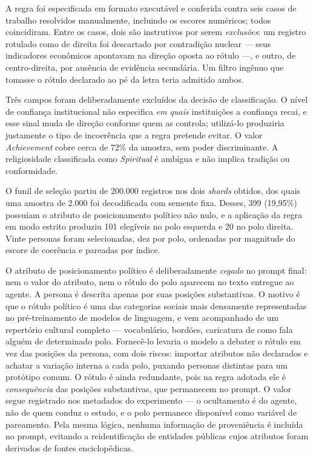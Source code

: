 \documentclass[conference]{IEEEtran} \IEEEoverridecommandlockouts %
\begin{document}
A regra foi especificada em formato executável e conferida contra seis casos de
trabalho resolvidos manualmente, incluindo os escores numéricos; todos
coincidiram. Entre os casos, dois são instrutivos por serem \textit{exclusões}:
um registro rotulado como de direita foi descartado por contradição nuclear —
seus indicadores econômicos apontavam na direção oposta ao rótulo —, e outro,
de centro-direita, por ausência de evidência secundária. Um filtro ingênuo que
tomasse o rótulo declarado ao pé da letra teria admitido ambos.

Três campos foram deliberadamente excluídos da decisão de classificação. O
nível de confiança institucional não especifica \textit{em quais} instituições
a confiança recai, e esse sinal muda de direção conforme quem as controla;
utilizá-lo produziria justamente o tipo de incoerência que a regra pretende
evitar. O valor \textit{Achievement} cobre cerca de 72\% da amostra, sem poder
discriminante. A religiosidade classificada como \textit{Spiritual} é ambígua e
não implica tradição ou conformidade.

O funil de seleção partiu de 200.000 registros nos dois \textit{shards}
obtidos, dos quais uma amostra de 2.000 foi decodificada com semente fixa.
Desses, 399 (19,95\%) possuíam o atributo de posicionamento político não nulo,
e a aplicação da regra em modo estrito produziu 101 elegíveis no polo esquerda
e 20 no polo direita. Vinte personas foram selecionadas, dez por polo,
ordenadas por magnitude do escore de coerência e pareadas por índice.

O atributo de posicionamento político é deliberadamente \textit{cegado} no
prompt final: nem o valor do atributo, nem o rótulo do polo aparecem no texto
entregue ao agente. A persona é descrita apenas por suas posições
substantivas. O motivo é que o rótulo político é uma das categorias sociais
mais densamente representadas no pré-treinamento de modelos de linguagem, e vem
acompanhado de um repertório cultural completo — vocabulário, bordões,
caricatura de como fala alguém de determinado polo. Fornecê-lo levaria o modelo
a debater o rótulo em vez das posições da persona, com dois riscos: importar
atributos não declarados e achatar a variação interna a cada polo, puxando
personas distintas para um protótipo comum. O rótulo é ainda redundante, pois
na regra adotada ele é \textit{consequência} das posições substantivas, que
permanecem no prompt. O valor segue registrado nos metadados do experimento — o
ocultamento é do agente, não de quem conduz o estudo, e o polo permanece
disponível como variável de pareamento. Pela mesma lógica, nenhuma informação
de proveniência é incluída no prompt, evitando a reidentificação de entidades
públicas cujos atributos foram derivados de fontes enciclopédicas.
\end{document}
